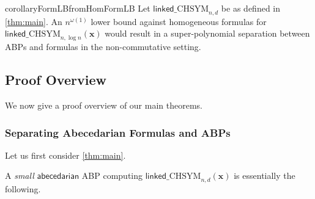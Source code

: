 \documentclass[10pt,a4paper]{article}
\def\vecx{\mathbf{x}}
\newcommand{\abcd}{\mathsf{abecedarian}}
\newcommand{\lchsym}[2]{\mathrm{\mathsf{linked}\_CHSYM}_{#1,#2}}
\begin{document}
\begin{restatable}{corollary}{FormLBfromHomFormLB}\label{cor:FormLBfromHomFormLB}
	Let $\lchsym{n}{d}$ be as defined in \autoref{thm:main}. 
	An $n^{\omega(1)}$ lower bound against homogeneous formulas for $\lchsym{n}{\log n}(\vecx)$ would result in a super-polynomial separation between ABPs and formulas in the non-commutative setting. 
\end{restatable}

 \subsection{Proof Overview}\label{sec:proof-overview}

We now give a proof overview of our main theorems.

\subsubsection*{Separating Abecedarian Formulas and ABPs}

Let us first consider \autoref{thm:main}.

\mainThm*

\noindent A \emph{small} $\abcd$ ABP computing $\lchsym{n}{d}(\vecx)$ is essentially the following.
\end{document}
